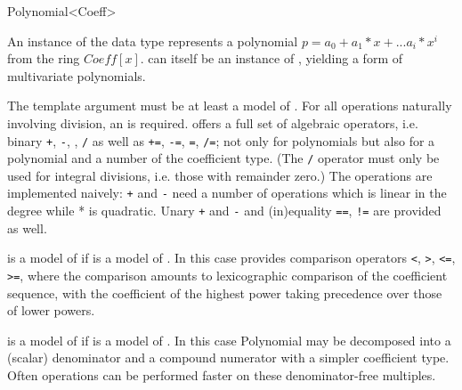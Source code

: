 
\begin{ccRefClass}{Polynomial<Coeff>}
\def\ccTagOperatorLayout{\ccFalse}

\ccDefinition

An instance of the data type  represents a
polynomial $p = a_0 + a_1*x + ...a_i*x^i$ from the ring $Coeff[x]$.
 can itself be an instance of , yielding a form of
multivariate polynomials. 

The template argument  must be at 
least a model of .
For all operations naturally involving division, an  
is required. 
 offers a full set of algebraic operators, i.e.
binary  {\tt +}, {\tt  -}, {\tt  *}, {\tt /} as well as  
{\tt +=}, {\tt -=}, {\tt *=}, {\tt  /=}; not only for polynomials
but also for a polynomial and a number of the coefficient type.
(The  {\tt /} operator must only be used for integral divisions, i.e.
those with remainder zero.)
The operations are implemented naively:  {\tt +} and  {\tt -} need a number of 
operations which is linear in the degree while * is quadratic.
Unary  {\tt +} and {\tt -} and (in)equality {\tt ==}, {\tt !=} are provided as well.

 is a model of  if  is a 
model of . In this case  provides 
comparison operators  {\tt <}, {\tt >}, {\tt <=}, {\tt >=}, where the comparison amounts to 
lexicographic comparison of the coefficient sequence,
with the coefficient of the highest power taking precedence over
those of lower powers.

 is a model of  if  is a 
model of . In this case Polynomial may be decomposed into a 
(scalar) denominator and a compound numerator with a simpler coefficient type. 
Often operations can be performed faster on these denominator-free multiples. 


\end{ccRefClass}
